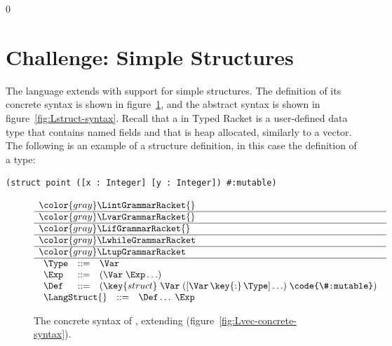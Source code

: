 \documentclass[7x10]{TimesAPriori_MIT}%
\newcommand{\gray}[1]{{\color{gray} #1}}
\def\racketEd{0}
\providecommand{\BookEdition}{1}
\let\edition\BookEdition
\numberwithin{theorem}{chapter}
\numberwithin{definition}{chapter}
\numberwithin{equation}{chapter}
\begin{document}
{\if\edition\racketEd
\section{Challenge: Simple Structures}
\label{sec:simple-structures}

The language \LangStruct{} extends \LangVec{} with support for simple
structures. The definition of its concrete syntax is shown in
figure~\ref{fig:Lstruct-concrete-syntax}, and the abstract syntax is
shown in figure~\ref{fig:Lstruct-syntax}. Recall that a 
in Typed Racket is a user-defined data type that contains named fields
and that is heap allocated,
similarly to a vector. The following is an
example of a structure definition, in this case the definition of a
 type:
\begin{lstlisting}
(struct point ([x : Integer] [y : Integer]) #:mutable)
\end{lstlisting}

\newcommand{\LstructGrammarRacket}{
\begin{array}{lcl}
  \Type &::=& \Var \\
  \Exp &::=& (\Var\;\Exp \ldots)\\
  \Def &::=& (\key{struct}\; \Var \; ([\Var \,\key{:}\, \Type] \ldots)\; \code{\#:mutable})\\
\end{array}
}
\newcommand{\LstructASTRacket}{
\begin{array}{lcl}
  \Type &::=& \VAR{\Var} \\
  \Exp &::=& \APPLY{\Var}{\Exp\ldots} \\
  \Def &::=& \LP\key{StructDef}\; \Var \; \LP\LS\Var \,\key{:}\, \Type\RS \ldots\RP\RP 
\end{array}
}

\begin{figure}[tbp]
\centering
\begin{tcolorbox}[colback=white]
\[
\begin{array}{l}
  \gray{\LintGrammarRacket{}} \\ \hline
  \gray{\LvarGrammarRacket{}} \\ \hline
  \gray{\LifGrammarRacket{}} \\ \hline
  \gray{\LwhileGrammarRacket} \\ \hline
  \gray{\LtupGrammarRacket} \\  \hline
  \LstructGrammarRacket \\
\begin{array}{lcl}
  \LangStruct{} &::=& \Def \ldots \; \Exp
\end{array}
\end{array}
\]
\end{tcolorbox}
\caption{The concrete syntax of \LangStruct{}, extending \LangVec{}
  (figure~\ref{fig:Lvec-concrete-syntax}).}
\label{fig:Lstruct-concrete-syntax}
\end{figure}

}
\end{document}
